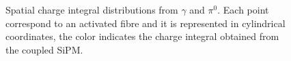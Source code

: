 \begin{figure}
	\centering
	 \quad
	\caption{Spatial charge integral distributions from $\gamma$ and $\pi^0$. Each point correspond to an activated fibre and it is represented in cylindrical coordinates, the color indicates the charge integral obtained from the coupled SiPM.}
	\label{fig:demo_shower}
\end{figure}

